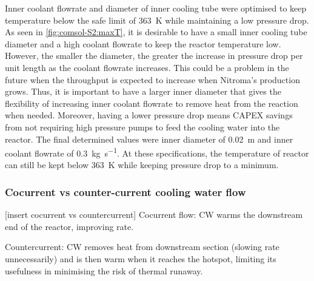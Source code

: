 Inner coolant flowrate and diameter of inner cooling tube were optimised to keep temperature below the safe limit of \SI{363}{\K} while maintaining a low pressure drop. As seen in \cref{fig:comsol-S2:maxT}, it is desirable to have a small inner cooling tube diameter and a high coolant flowrate to keep the reactor temperature low. However, the smaller the diameter, the greater the increase in pressure drop per unit length as the coolant flowrate increases. This could be a problem in the future when the throughput is expected to increase when Nitroma's production grows. Thus, it is important to have a larger inner diameter that gives the flexibility of increasing inner coolant flowrate to remove heat from the reaction when needed. Moreover, having a lower pressure drop means CAPEX savings from not requiring high pressure pumps to feed the cooling water into the reactor. The final determined values were inner diameter of \SI{0.02}{\m} and inner coolant flowrate of \SI{0.3}{\kg\per\s}. At these specifications, the temperature of reactor can still be kept below \SI{363}{\K} while keeping pressure drop to a minimum.

\subsubsection{Cocurrent vs counter-current cooling water flow}
[insert cocurrent vs countercurrent]
Cocurrent flow: CW warms the downstream end of the reactor, improving rate.

Countercurrent: CW removes heat from downstream section (slowing rate unnecessarily) and is then warm when it reaches the hotspot, limiting its usefulness in minimising the risk of thermal runaway.

